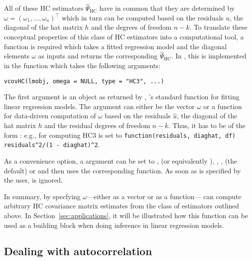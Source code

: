 \documentclass{Z}
\begin{document}
All of these HC estimators $\hat \Psi_{\mathrm{HC}}$ have in common that 
they are determined by $\omega = (\omega_1, \dots, \omega_n)^\top$ which in turn can
be computed based on the residuals $\hat u$, the diagonal of the hat matrix $h$
and the degrees of freedom $n-k$.
To translate these conceptual properties of  this class of HC estimators into
a computational tool, a function is required which takes 
a fitted regression model and the diagonal elements $\omega$ as
inputs and returns the corresponding $\hat \Psi_{\mathrm{HC}}$. In ,
this is implemented in the function  which takes
the following arguments:
\begin{verbatim}
vcovHC(lmobj, omega = NULL, type = "HC3", ...)
\end{verbatim}
The first argument  is an object as returned by ,
's standard function for fitting linear regression models.
The argument  can either be the vector $\omega$ or
a function for data-driven computation of $\omega$ based on
the residuals $\hat u$, the diagonal of the hat matrix $h$ 
and the residual degrees of freedom $n-k$. Thus, it has to be
of the form : e.g.,
for computing HC3  is set to
\verb+function(residuals, diaghat, df) residuals^2/(1 - diaghat)^2+.

As a convenience option, a  argument can be set to
,  (or equivalently ),
, ,  (the default) or
 and then  uses the corresponding 
function. As soon as  is specified by the user,  is ignored.

In summary, by specfying $\omega$---either as a vector or as a
function--- can compute arbitrary HC covariance matrix estimates
from the class of estimators outlined above. In Section~\ref{sec:applications},
it will be illustrated how this function can be used as a building
block when doing inference in linear regression models.


\subsection{Dealing with autocorrelation}
\end{document}
